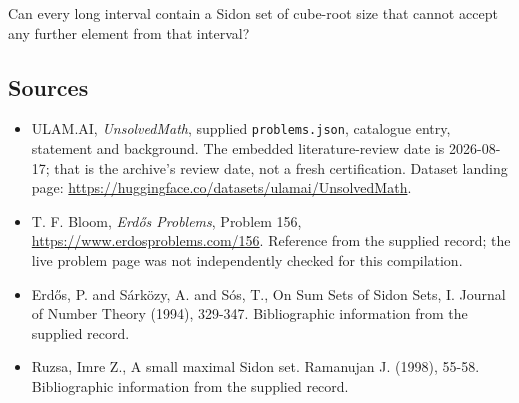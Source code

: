 \documentclass[11pt,a4paper]{article}
\begin{document}
Can every long interval contain a Sidon set of cube-root size that cannot accept any further element from that interval?

\subsection{Sources}

{\small

\begin{itemize}

\item[\hypertarget{source:statement:1}{S1}] ULAM.AI, \emph{UnsolvedMath}, supplied \texttt{problems.json}, catalogue entry, statement and background. The embedded literature-review date is 2026-08-17; that is the archive’s review date, not a fresh certification. Dataset landing page: \url{https://huggingface.co/datasets/ulamai/UnsolvedMath}.

\item[\hypertarget{source:statement:2}{S2}] T. F. Bloom, \emph{Erdős Problems}, Problem 156, \url{https://www.erdosproblems.com/156}. Reference from the supplied record; the live problem page was not independently checked for this compilation.

\item[\hypertarget{source:statement:3}{S3}] Erd\H{o}s, P. and S\'{a}rk\"{o}zy, A. and S\'{o}s, T., On Sum Sets of Sidon Sets, I. Journal of Number Theory (1994), 329-347. Bibliographic information from the supplied record.

\item[\hypertarget{source:statement:4}{S4}] Ruzsa, Imre Z., A small maximal Sidon set. Ramanujan J. (1998), 55-58. Bibliographic information from the supplied record.

\end{itemize}

}

\label{end:statement}
\end{document}
